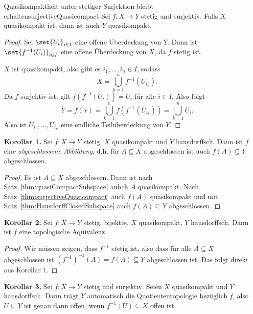 \documentclass[language=ngerman]{TemplateLecture} %
\begin{document}
\begin{thm}{Quasikompaktheit unter stetiger Surjektion bleibt erhalten}{surjectiveQuasicompact}
    Sei $f: X \to Y$ stetig und surjektiv. Falls $X$ quasikompakt ist, dann ist auch $Y$ quasikompakt.
\end{thm}
\begin{proof}
    Sei $\set{U_i}_{i \in I}$ eine offene Überdeckung von $Y$. Dann ist $\set{f^{-1}(U_i)}_{i \in I}$ eine offene Überdeckung von $X$, da $f$ stetig ist.

    $X$ ist quasikompakt, also gibt es $i_1, \ldots, i_n \in I$, sodass
    \begin{equation*}
        X = \bigcup_{k = 1}^n f^{-1}(U_{i_k}).
    \end{equation*}
    Da $f$ surjektiv ist, gilt $f(f^{-1}(U_i)) = U_i$ für alle $i \in I$. Also folgt 
    \begin{equation*}
        Y = f(x) = \bigcup_{k = 1}^n f(f^{-1}(U_{i_k})) = \bigcup_{k = 1}^n U_i.
    \end{equation*}
    Also ist $U_{i_1}, \ldots, U_{i_n}$ eine endliche Teilüberdeckung von $Y$.
\end{proof}

\textbf{Korollar 1.} Sei $f: X \to Y$ stetig, $X$ quasikompakt und $Y$ hausdorffsch. Dann ist $f$ eine \emph{abgeschlossene Abbildung}, d.h. für $A \subseteq X$ abgeschlossen ist auch $f(A) \subseteq Y$ abgeschlossen. 

\begin{proof}
    Es ist $A \subseteq X$ abgeschlossen. Dann ist nach Satz~\ref{thm:quasiCompactSubspace} auhch $A$ quasikompakt. Nach Satz~\ref{thm:surjectiveQuasicompact} auch $f(A)$ quasikompakt und mit Satz~\ref{thm:HausdorffClosedSubspace} auch $f(A) \subseteq Y$ abgeschlossen.
\end{proof}

\textbf{Korollar 2.} Sei $f: X \to Y$ stetig, bijektiv, $X$ quasikompakt, $Y$ hausdorffsch. Dann ist $f$ eine topologische Äquivalenz.

\begin{proof}
    Wir müssen zeigen, dass $f^{-1}$ stetig ist, also dass für alle $A \subseteq X$ abgeschlossen ist $\left(f^{-1}\right)^{-1}(A) = f(A) \subseteq Y$ abgeschlossen ist. Das folgt direkt aus Korollar 1.
\end{proof}

\textbf{Korollar 3.} Sei $f: X \to Y$ stetig und surjektiv. Seien $X$ quasikompakt und $Y$ hausdorffsch. Dann trägt $Y$ automatisch die Quotiententopologie bezüglich $f$, also $U \subseteq Y$ ist genau dann offen, wenn $f^{-1}(U) \subseteq X$ offen ist.
\end{document}
